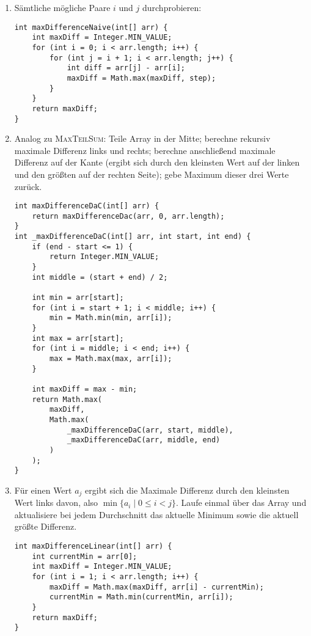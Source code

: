 \documentclass[11pt,a4paper]{article}
\begin{document}
\begin{loesung}
\begin{enumerate}
    \item Sämtliche mögliche Paare $i$ und $j$ durchprobieren:
    \begin{lstlisting}
int maxDifferenceNaive(int[] arr) {
    int maxDiff = Integer.MIN_VALUE;
    for (int i = 0; i < arr.length; i++) {
        for (int j = i + 1; i < arr.length; j++) {
            int diff = arr[j] - arr[i];
            maxDiff = Math.max(maxDiff, step);
        }
    }
    return maxDiff;
}        
    \end{lstlisting}

    \item Analog zu \textsc{MaxTeilSum}: Teile Array in der Mitte; berechne rekursiv maximale Differenz links und rechts; berechne anschließend maximale Differenz auf der Kante (ergibt sich durch den kleinsten Wert auf der linken und den größten auf der rechten Seite); gebe Maximum dieser drei Werte zurück.
    \begin{lstlisting}
int maxDifferenceDaC(int[] arr) {
    return maxDifferenceDac(arr, 0, arr.length);
}
int _maxDifferenceDaC(int[] arr, int start, int end) {
    if (end - start <= 1) {
        return Integer.MIN_VALUE;
    }
    int middle = (start + end) / 2;

    int min = arr[start];
    for (int i = start + 1; i < middle; i++) {
        min = Math.min(min, arr[i]);
    }
    int max = arr[start];
    for (int i = middle; i < end; i++) {
        max = Math.max(max, arr[i]);
    }

    int maxDiff = max - min;
    return Math.max(
        maxDiff, 
        Math.max(
            _maxDifferenceDaC(arr, start, middle),
            _maxDifferenceDaC(arr, middle, end)
        )
    );
}
    \end{lstlisting}

    \item Für einen Wert $a_j$ ergibt sich die Maximale Differenz durch den kleinsten Wert links davon, also $\min \{a_i \mid 0 \leq i < j\}$. Laufe einmal über das Array und aktualisiere bei jedem Durchschnitt das aktuelle Minimum sowie die aktuell größte Differenz.
    \begin{lstlisting}
int maxDifferenceLinear(int[] arr) {
    int currentMin = arr[0];
    int maxDiff = Integer.MIN_VALUE;
    for (int i = 1; i < arr.length; i++) {
        maxDiff = Math.max(maxDiff, arr[i] - currentMin);
        currentMin = Math.min(currentMin, arr[i]);
    }
    return maxDiff;
}
    \end{lstlisting}
\end{enumerate}
\end{loesung}
\end{document}
